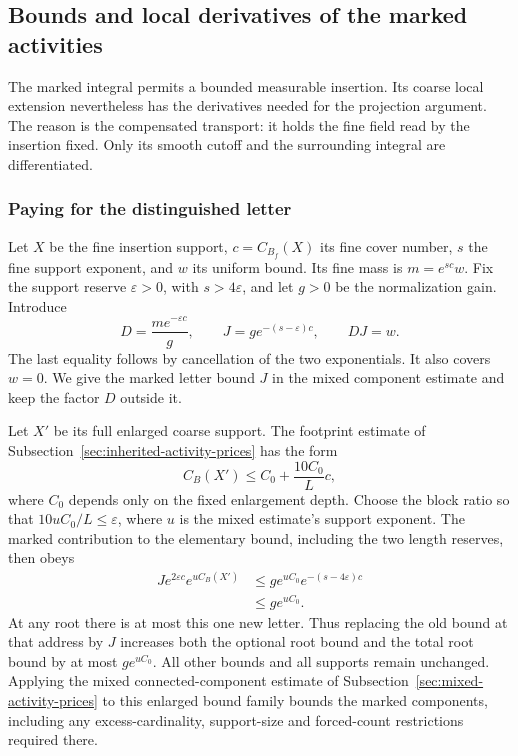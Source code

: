 \subsection{Bounds and local derivatives of the marked activities}
\label{sec:marked-activity-jets}
The marked integral permits a bounded measurable insertion. Its
coarse local extension nevertheless has the derivatives needed for
the projection argument. The reason is the compensated transport:
it holds the fine field read by the insertion fixed. Only its smooth
cutoff and the surrounding integral are differentiated.

\subsubsection{Paying for the distinguished letter}
Let $X$ be the fine insertion support, $c=C_{B_f}(X)$ its fine
cover number, $s$ the fine support exponent, and $w$ its uniform
bound. Its fine mass is $m=e^{sc}w$. Fix the support reserve
$\varepsilon>0$, with $s>4\varepsilon$, and let $g>0$ be the
normalization gain. Introduce
\begin{equation}\label{eq:marked-debt-price}
 D=\frac{m e^{-\varepsilon c}}g,\qquad
 J=g e^{-(s-\varepsilon)c},\qquad DJ=w.
\end{equation}
The last equality follows by cancellation of the two exponentials.
It also covers $w=0$. We give the marked letter bound $J$ in the
mixed component estimate and keep the factor $D$ outside it.

Let $X'$ be its full enlarged coarse support. The footprint
estimate of Subsection~\ref{sec:inherited-activity-prices} has the form
\[
 C_B(X')\le C_0+\frac{10C_0}{L}c,
\]
where $C_0$ depends only on the fixed enlargement depth. Choose
the block ratio so that $10uC_0/L\le\varepsilon$, where $u$ is the
mixed estimate's support exponent. The marked contribution to
the elementary bound, including the two length reserves, then obeys
\begin{align*}
 J e^{2\varepsilon c}e^{uC_B(X')}
 &\le g e^{uC_0}e^{-(s-4\varepsilon)c}\\
 &\le g e^{uC_0}.
\end{align*}
At any root there is at most this one new letter. Thus replacing
the old bound at that address by $J$ increases both the optional
root bound and the total root bound by at most $g e^{uC_0}$.
All other bounds and all supports remain unchanged. Applying the
mixed connected-component estimate of
Subsection~\ref{sec:mixed-activity-prices} to this enlarged bound
family bounds the marked components, including any excess-cardinality,
support-size and forced-count restrictions required there.

